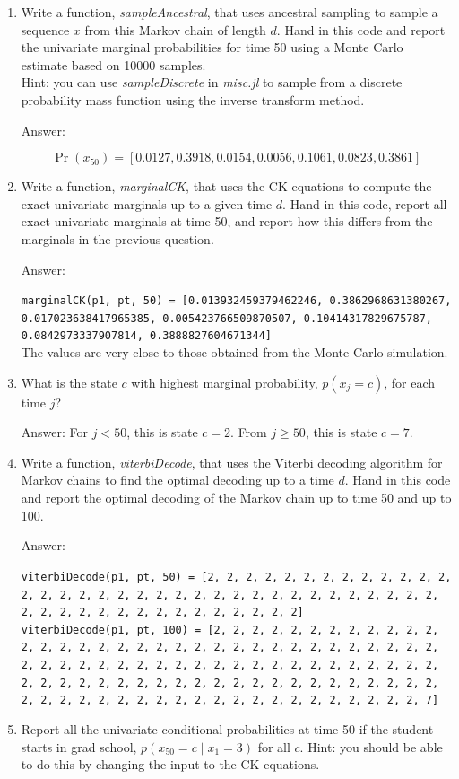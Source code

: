 \documentclass{article}
\def\ans#1{\par\gre{Answer: #1}}
\def\blu#1{{\color{blu}#1}}
\def\gre#1{{\color{gre}#1}}
\def\cond{\; | \;}
\def\enum#1{\begin{enumerate}#1\end{enumerate}}
\begin{document}
\enum{
\item Write a function, \emph{sampleAncestral}, that uses ancestral sampling to sample a sequence $x$ from this Markov chain of length $d$. \blu{Hand in this code and report the univariate marginal probabilities for time 50 using a Monte Carlo estimate based on 10000 samples.}\\
Hint: you can use \emph{sampleDiscrete} in \emph{misc.jl} to sample from a discrete probability mass function using the inverse transform method.
\ans{

\[\Pr(x_{50})=[0.0127, 0.3918, 0.0154, 0.0056, 0.1061, 0.0823, 0.3861]\]
}
\pagebreak
\item Write a function, \emph{marginalCK}, that uses the CK equations to compute the exact univariate marginals up to a given time $d$. \blu{Hand in this code, report all exact univariate marginals at time 50, and report how this differs from the marginals in the previous question.}
\ans{

\texttt{marginalCK(p1, pt, 50) = [0.013932459379462246, 0.3862968631380267, 0.017023638417965385, 0.005423766509870507, 0.10414317829675787, 0.0842973337907814, 0.3888827604671344]}\\
The values are very close to those obtained from the Monte Carlo simulation.
}
\item What is the state $c$ with highest marginal probability, $p(x_j = c)$, for each time $j$?
\ans{
For $j<50$, this is state $c=2$. From $j\geq 50$, this is state $c=7$.
}
\item Write a function, \emph{viterbiDecode}, that uses the Viterbi decoding algorithm for Markov chains to find the optimal decoding up to a time $d$. \blu{Hand in this code and report the optimal decoding of the Markov chain up to time 50 and up to 100.}
\ans{

\texttt{viterbiDecode(p1, pt, 50) = [2, 2, 2, 2, 2, 2, 2, 2, 2, 2, 2, 2, 2, 2, 2, 2, 2, 2, 2, 2, 2, 2, 2, 2, 2, 2, 2, 2, 2, 2, 2, 2, 2, 2, 2, 2, 2, 2, 2, 2, 2, 2, 2, 2, 2, 2, 2, 2, 2, 2]\\
viterbiDecode(p1, pt, 100) = [2, 2, 2, 2, 2, 2, 2, 2, 2, 2, 2, 2, 2, 2, 2, 2, 2, 2, 2, 2, 2, 2, 2, 2, 2, 2, 2, 2, 2, 2, 2, 2, 2, 2, 2, 2, 2, 2, 2, 2, 2, 2, 2, 2, 2, 2, 2, 2, 2, 
2, 2, 2, 2, 2, 2, 2, 2, 2, 2, 2, 2, 2, 2, 2, 2, 2, 2, 2, 2, 2, 2, 2, 2, 2, 2, 2, 2, 2, 2, 2, 2, 2, 2, 2, 2, 2, 2, 2, 2, 2, 2, 2, 2, 2, 2, 2, 2, 2, 2, 7]
}
}
\pagebreak
\item \blu{Report all the univariate conditional probabilities at time 50 if the student starts in grad school, $p(x_{50} = c \cond  x_1 = 3)$ for all $c$}. Hint: you should be able to do this by changing the input to the CK equations.
}
\end{document}
